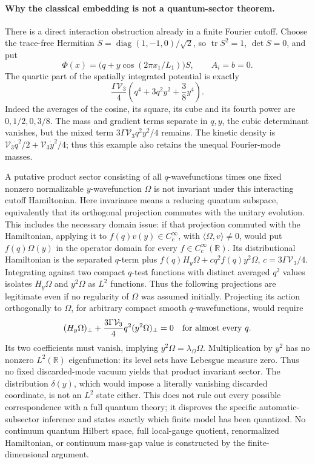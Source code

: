 \paragraph{Why the classical embedding is not a quantum-sector theorem.}
There is a direct interaction obstruction already in a finite Fourier
cutoff. Choose the trace-free Hermitian
\(S=\operatorname{diag}(1,-1,0)/\sqrt2\), so
\(\operatorname{tr}S^2=1\), \(\det S=0\), and put
\[
 \Phi(x)=\bigl(q+y\cos(2\pi x_1/L_1)\bigr)S,\qquad A_i=b=0 .
\]
The quartic part of the spatially integrated potential is exactly
\[
 \frac{\Gamma\mathcal V_3}{4}
       \left(q^4+3q^2y^2+\frac38y^4\right).
\]
Indeed the averages of the cosine, its square, its cube and its
fourth power are \(0,1/2,0,3/8\). The mass and gradient terms
separate in \(q,y\), the cubic determinant vanishes, but the mixed
term \(3\Gamma\mathcal V_3q^2y^2/4\) remains.
The kinetic density is
\(\mathcal V_3\dot q^2/2+\mathcal V_3\dot y^2/4\);
thus this example also retains the unequal Fourier-mode masses.

A putative product sector consisting of all \(q\)-wavefunctions
times one fixed nonzero normalizable \(y\)-wavefunction \(\Omega\)
is not invariant under this interacting cutoff Hamiltonian.
Here invariance means a reducing quantum subspace, equivalently that
its orthogonal projection commutes with the unitary evolution.
This includes the necessary domain issue: if that projection
commuted with the Hamiltonian, applying it to
\(f(q)v(y)\in C_c^\infty\), with \(\langle\Omega,v\rangle\ne0\),
would put \(f(q)\Omega(y)\) in the operator domain for every
\(f\in C_c^\infty(\mathbb R)\). Its distributional Hamiltonian is
the separated \(q\)-term plus
\(f(q)H_y\Omega+cq^2f(q)y^2\Omega\),
\(c=3\Gamma\mathcal V_3/4\). Integrating against two compact
\(q\)-test functions with distinct averaged \(q^2\) values
isolates \(H_y\Omega\) and \(y^2\Omega\) as \(L^2\) functions.
Thus the following projections are legitimate even if no regularity
of \(\Omega\) was assumed initially.
Projecting its action orthogonally to \(\Omega\), for arbitrary
compact smooth \(q\)-wavefunctions, would require
\[
 (H_y\Omega)_\perp+
       \frac{3\Gamma\mathcal V_3}{4}q^2(y^2\Omega)_\perp=0
                         \quad\hbox{for almost every }q .
\]
Its two coefficients must vanish, implying
\(y^2\Omega=\lambda_\Omega\Omega\). Multiplication by \(y^2\) has no nonzero
\(L^2(\mathbb R)\) eigenfunction: its level sets have Lebesgue
measure zero. Thus no fixed discarded-mode vacuum yields that
product invariant sector. The distribution \(\delta(y)\), which
would impose a literally vanishing discarded coordinate, is not
an \(L^2\) state either.
This does not rule out every possible correspondence with a full
quantum theory; it disproves the specific automatic-subsector
inference and states exactly which finite model has been quantized.
No continuum quantum Hilbert space, full local-gauge quotient,
renormalized Hamiltonian, or continuum mass-gap value is constructed
by the finite-dimensional argument.

